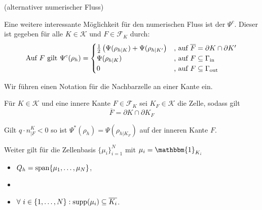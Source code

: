 \begin{remark}(alternativer numerischer Fluss)
	
	Eine weitere interessante Möglichkeit für den numerischen Fluss ist der  $ \Psi^c $. Dieser ist gegeben für alle $ K \in \mathcal{K} $ und $ F \in \mathcal{F}_K $ durch:
	\begin{gather*}
		\text{Auf } F \text{ gilt }\Psi^c(\rho_h) = \begin{cases}
		\frac{1}{2} \left( \Psi(\rho_{h|K}) + \Psi(\rho_{h|K'}  \right) &\text{, auf } \overline{F} = \partial K \cap \partial K'\\
		\Psi(\rho_{h|K}) &\text{, auf } F \subseteq \Gamma_{{\text{in}}}\\
		0 &\text{, auf } F \subseteq \Gamma_{{\text{out}}} 
		\end{cases}
	\end{gather*}
\end{remark}

\begin{remark}
	Wir führen einen Notation für die Nachbarzelle an einer Kante ein.
	
	Für $ K \in \mathcal{K} $ und eine innere Kante $ F \in \mathcal{F}_K $ sei $ K_F \in \mathcal{K}$ die Zelle, sodass gilt \[ \overline{F} = \partial K \cap \partial K_F \]
	
	Gilt  $q\cdot n^K_{|F} < 0$ so ist $ \Psi^*(\rho_h) = \Psi(\rho_{h|K_F}) $ auf der inneren Kante $ F $.
\end{remark}
\bigskip
Weiter gilt für die Zellenbasis $ \{\mu_i\}_{i=1}^N $ mit $ \mu_i = \mathbbm{1}_{K_i} $ 
\begin{itemize}
	\item $ Q_h = \operatorname{span}\{\mu_1, \dots , \mu_N\} $,
	\item {}
	\item $ \forall \ i \in \{1, \dots , N\}:  \operatorname{supp}(\mu_i) \subseteq \overline{K_i}$.
\end{itemize}
 
